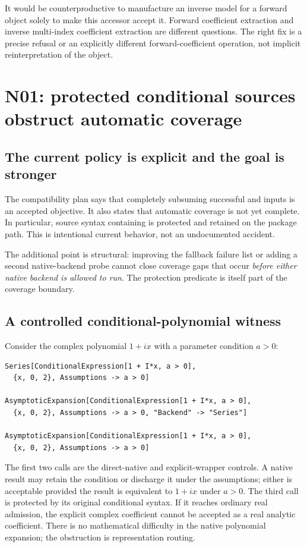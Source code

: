 \documentclass[11pt,letterpaper]{article}
\theoremstyle{definition}\newtheorem{definition}[proposition]{Definition}
\begin{document}
It would be counterproductive to manufacture an inverse model for a forward
object solely to make this accessor accept it. Forward coefficient extraction
and inverse multi-index coefficient extraction are different questions. The
right fix is a precise refusal or an explicitly different forward-coefficient
operation, not implicit reinterpretation of the object.

\section{N01: protected conditional sources obstruct automatic coverage}
\subsection{The current policy is explicit and the goal is stronger}
The compatibility plan says that completely subsuming successful
 and  inputs is an accepted objective.
It also states that automatic coverage is not yet complete. In particular,
source syntax containing  is protected and retained
on the package path. This is intentional current behavior, not an undocumented
accident.\cite{compatibility,native}

The additional point is structural: improving the fallback failure list or
adding a second native-backend probe cannot close coverage gaps that occur
\emph{before either native backend is allowed to run}. The protection predicate
is itself part of the coverage boundary.

\subsection{A controlled conditional-polynomial witness}
Consider the complex polynomial $1+ix$ with a parameter condition $a>0$:
\begin{lstlisting}
Series[ConditionalExpression[1 + I*x, a > 0],
  {x, 0, 2}, Assumptions -> a > 0]

AsymptoticExpansion[ConditionalExpression[1 + I*x, a > 0],
  {x, 0, 2}, Assumptions -> a > 0, "Backend" -> "Series"]

AsymptoticExpansion[ConditionalExpression[1 + I*x, a > 0],
  {x, 0, 2}, Assumptions -> a > 0]
\end{lstlisting}
The first two calls are the direct-native and explicit-wrapper controls.
A native result may retain the condition or discharge it under the assumptions;
either is acceptable provided the result is equivalent to $1+ix$ under $a>0$.
The third call is protected by its original conditional syntax. If it reaches
ordinary real admission, the explicit complex coefficient cannot be accepted
as a real analytic coefficient. There is no mathematical difficulty in the
native polynomial expansion; the obstruction is representation routing.
\cite{native,core,contracts}
\end{document}
